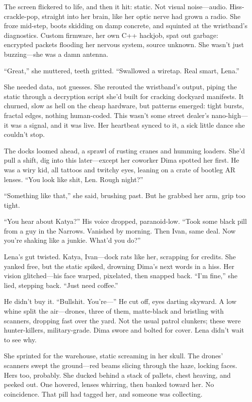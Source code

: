 \documentclass[12pt]{book}
\begin{document}
The screen flickered to life, and then it hit: static. Not visual noise---audio. Hiss-crackle-pop, straight into her brain, like her optic nerve had grown a radio. She froze mid-step, boots skidding on damp concrete, and squinted at the wristband’s diagnostics. Custom firmware, her own C++ hackjob, spat out garbage: encrypted packets flooding her nervous system, source unknown. She wasn’t just buzzing---she was a damn antenna.

``Great,'' she muttered, teeth gritted. ``Swallowed a wiretap. Real smart, Lena.''

She needed data, not guesses. She rerouted the wristband’s output, piping the static through a decryption script she’d built for cracking dockyard manifests. It churned, slow as hell on the cheap hardware, but patterns emerged: tight bursts, fractal edges, nothing human-coded. This wasn’t some street dealer’s nano-high---it was a signal, and it was live. Her heartbeat synced to it, a sick little dance she couldn’t stop.

The docks loomed ahead, a sprawl of rusting cranes and humming loaders. She’d pull a shift, dig into this later---except her coworker Dima spotted her first. He was a wiry kid, all tattoos and twitchy eyes, leaning on a crate of bootleg AR lenses. ``You look like shit, Len. Rough night?''

``Something like that,'' she said, brushing past. But he grabbed her arm, grip too tight.

``You hear about Katya?'' His voice dropped, paranoid-low. ``Took some black pill from a guy in the Narrows. Vanished by morning. Then Ivan, same deal. Now you’re shaking like a junkie. What’d you do?''

Lena’s gut twisted. Katya, Ivan---dock rats like her, scrapping for credits. She yanked free, but the static spiked, drowning Dima’s next words in a hiss. Her vision glitched---his face warped, pixelated, then snapped back. ``I’m fine,'' she lied, stepping back. ``Just need coffee.''

He didn’t buy it. ``Bullshit. You’re---'' He cut off, eyes darting skyward. A low whine split the air---drones, three of them, matte-black and bristling with scanners, dropping fast over the yard. Not the usual patrol clunkers; these were hunter-killers, military-grade. Dima swore and bolted for cover. Lena didn’t wait to see why.

She sprinted for the warehouse, static screaming in her skull. The drones’ scanners swept the ground---red beams slicing through the haze, locking faces. Hers too, probably. She ducked behind a stack of pallets, chest heaving, and peeked out. One hovered, lenses whirring, then banked toward her. No coincidence. That pill had tagged her, and someone was collecting.
\end{document}
